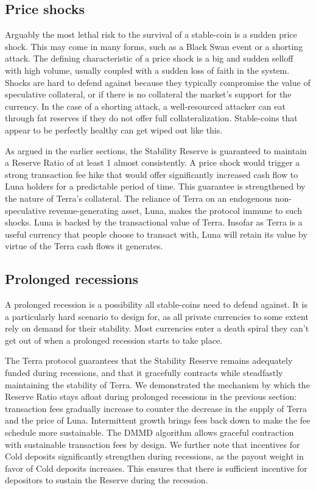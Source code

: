 \documentclass{article}
\begin{document}
\subsection{Price shocks}

Arguably the most lethal risk to the survival of a stable-coin is a sudden price shock. This may come in many forms, such as a Black Swan event or a shorting attack. The defining characteristic of a price shock is a big and sudden selloff with high volume, usually coupled with a sudden loss of faith in the system. Shocks are hard to defend against because they typically compromise the value of speculative collateral, or if there is no collateral the market's support for the currency. In the case of a shorting attack, a well-resourced attacker can eat through fat reserves if they do not offer full collateralization. Stable-coins that appear to be perfectly healthy can get wiped out like this.

As argued in the earlier sections, the Stability Reserve is guaranteed to maintain a Reserve Ratio of at least 1 almost consistently. A price shock would trigger a strong transaction fee hike that would offer significantly increased cash flow to Luna holders for a predictable period of time. This guarantee is strengthened by the nature of Terra's collateral. The reliance of Terra on an endogenous non-speculative revenue-generating asset, Luna, makes the protocol immune to such shocks. Luna is backed by the transactional value of Terra. Insofar as Terra is a useful currency that people choose to transact with, Luna will retain its value by virtue of the Terra cash flows it generates.

\subsection{Prolonged recessions}

A prolonged recession is a possibility all stable-coins need to defend against. It is a particularly hard scenario to design for, as all private currencies to some extent rely on demand for their stability. Most currencies enter a death spiral they can't get out of when a prolonged recession starts to take place.

The Terra protocol guarantees that the Stability Reserve remains adequately funded during recessions, and that it gracefully contracts while steadfastly maintaining the stability of Terra. We demonstrated the mechanism by which the Reserve Ratio stays afloat during prolonged recessions in the previous section: transaction fees gradually increase to counter the decrease in the supply of Terra and the price of Luna. Intermittent growth brings fees back down to make the fee schedule more sustainable. The DMMD algorithm allows graceful contraction with sustainable transaction fees by design. We further note that incentives for Cold deposits significantly strengthen during recessions, as the payout weight in favor of Cold deposits increases. This ensures that there is sufficient incentive for depositors to sustain the Reserve during the recession.
\end{document}
